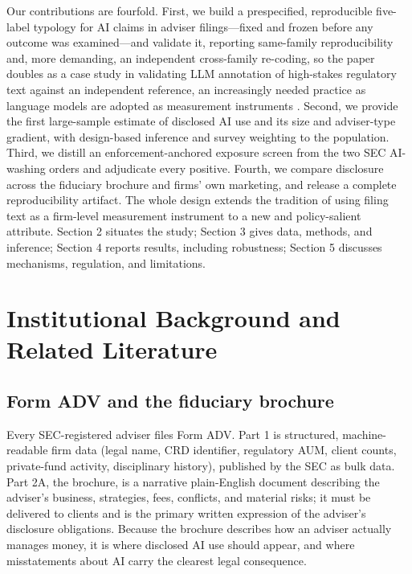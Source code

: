 \documentclass[utf8]{FrontiersinHarvard} %
\begin{document}
Our contributions are fourfold. First, we build a prespecified, reproducible five-label typology for AI claims in adviser filings---fixed and frozen before any outcome was examined---and validate it, reporting same-family reproducibility and, more demanding, an independent cross-family re-coding, so the paper doubles as a case study in validating LLM annotation of high-stakes regulatory text against an independent reference, an increasingly needed practice as language models are adopted as measurement instruments \citep{gilardi2023,tornberg2023,ziems2024,rathje2024,ollion2024}. Second, we provide the first large-sample estimate of disclosed AI use and its size and adviser-type gradient, with design-based inference and survey weighting to the population. Third, we distill an enforcement-anchored exposure screen from the two SEC AI-washing orders and adjudicate every positive. Fourth, we compare disclosure across the fiduciary brochure and firms' own marketing, and release a complete reproducibility artifact. The whole design extends the tradition of using filing text as a firm-level measurement instrument \citep{tetlock2007,loughran2011,hoberg2016,cohenLazy2020,abis2022} to a new and policy-salient attribute. Section 2 situates the study; Section 3 gives data, methods, and inference; Section 4 reports results, including robustness; Section 5 discusses mechanisms, regulation, and limitations.

\section{Institutional Background and Related Literature}

\subsection{Form ADV and the fiduciary brochure}
Every SEC-registered adviser files Form ADV. Part 1 is structured, machine-readable firm data (legal name, CRD identifier, regulatory AUM, client counts, private-fund activity, disciplinary history), published by the SEC as bulk data. Part 2A, the brochure, is a narrative plain-English document describing the adviser's business, strategies, fees, conflicts, and material risks; it must be delivered to clients and is the primary written expression of the adviser's disclosure obligations. Because the brochure describes how an adviser actually manages money, it is where disclosed AI use should appear, and where misstatements about AI carry the clearest legal consequence.
\end{document}
